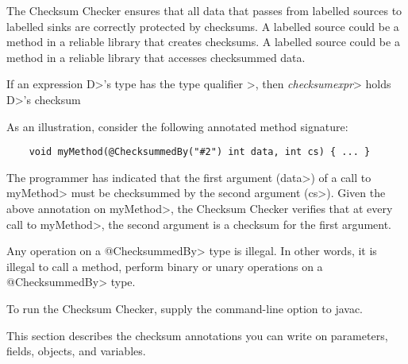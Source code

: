 \htmlhr
{}

The Checksum Checker ensures that all data that passes from labelled sources
to labelled sinks are correctly protected by checksums.
A labelled source could be a method in a reliable library that creates checksums.
A labelled source could be a method in a reliable library that accesses checksummed data.

If an expression \<D>'s type has the type qualifier
\<>,
then \<\small\emph{checksumexpr}> holds \<D>'s checksum

As an illustration, consider the following annotated method signature:
\begin{Verbatim}
    void myMethod(@ChecksummedBy("#2") int data, int cs) { ... }
\end{Verbatim}
The programmer has indicated that the first argument (\<data>) of a call to
\<myMethod> must be checksummed by the second argument (\<cs>).
Given the above annotation on \<myMethod>, the Checksum Checker verifies that at
every call to \<myMethod>, the second argument is a checksum for the first argument.

Any operation on a \<@ChecksummedBy> type is illegal.
In other words, it is illegal to call a method, perform binary or unary
operations on a \<@ChecksummedBy> type.

To run the Checksum Checker, supply the
command-line option to javac.


This section describes the checksum annotations you can write on parameters, fields, objects, and variables.


